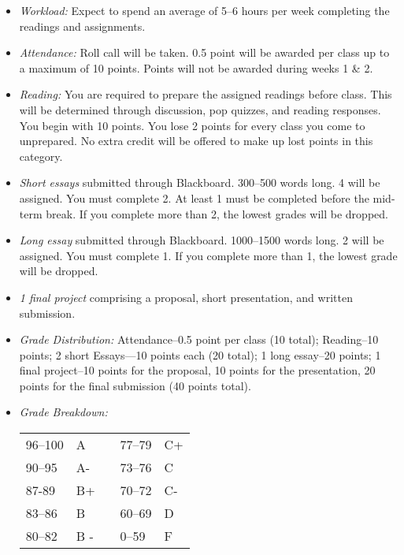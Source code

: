 \documentclass[article,oneside]{memoir}
\begin{document}
\begin{itemize}
\item \textit{Workload:} Expect to spend an average of 5--6 hours per week  completing the readings and assignments.

\item \textit{Attendance:} Roll call will be taken. 0.5 point will be awarded per class up to a maximum of 10 points. Points will not be awarded during weeks 1 \& 2. 

\item \textit{Reading:} You are required to prepare the assigned readings before class. This will be determined through discussion, pop quizzes, and reading responses. You begin with 10 points. You lose 2 points for every class you come to unprepared. No extra credit will be offered to make up lost points in this category. 

\item \textit{Short essays} submitted through Blackboard. 300--500 words long. 4 will be assigned. You must complete 2. At least 1 must be completed before the mid-term break. If you complete more than 2, the lowest grades will be dropped.
 
\item \textit{Long essay} submitted through Blackboard. 1000--1500 words long. 2 will be assigned. You must complete 1. If you complete more than 1, the lowest grade will be dropped.

 
\item \textit{1 final project} comprising a proposal, short presentation, and written submission.



\item \textit{Grade Distribution:} Attendance--0.5 point per class (10 total); Reading--10 points; 2 short Essays---10 points each (20 total); 1 long essay--20 points; 1 final project--10 points for the proposal, 10 points for the presentation, 20 points for the final submission (40 points total).

\item \textit{Grade Breakdown:}

 \begin{tabular}{ | l | l | p{2cm} | l | l | }
    \hline 
96--100 & A  & &  77--79 &  C+ \\  
90--95 & A- & &  73--76 & C \\
87-89 & B+ &  &  70--72 & C- \\ 
83--86 & B  & &  60--69 & D\\
80--82 & B - & & 0--59 & F\\ \hline
    \end{tabular}


\end{itemize}
\end{document}
